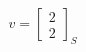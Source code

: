 \documentclass[preview]{standalone}
\begin{document}
\begin{align*}
v = \begin{bmatrix} 2 \\ 2 \end{bmatrix}_S
\end{align*}
\end{document}
